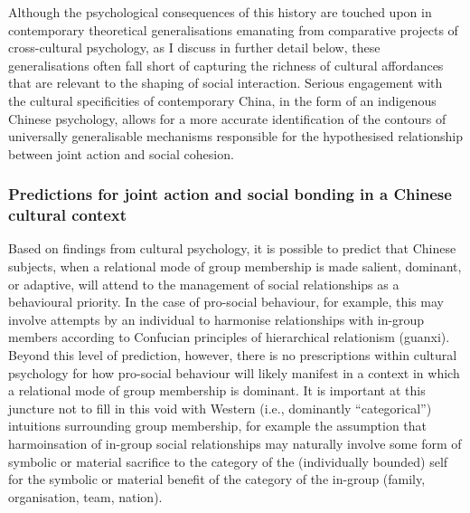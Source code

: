 {Although the psychological consequences of this history are touched upon in contemporary theoretical generalisations emanating from comparative projects of cross-cultural psychology, as I discuss in further detail below, these generalisations often fall short of capturing the richness of cultural affordances that are relevant to the shaping of social interaction.  Serious engagement with the cultural specificities of contemporary China, in the form of an indigenous Chinese psychology, allows for a more accurate identification of the contours of universally generalisable mechanisms responsible for the hypothesised relationship between joint action and social cohesion.




  \subsubsection{Predictions for joint action and social bonding in a Chinese cultural context}


  Based on findings from cultural psychology, it is possible to predict that Chinese subjects, when a relational mode of group membership is made salient, dominant, or adaptive, will attend to the management of social relationships as a behavioural priority.  In the case of pro-social behaviour, for example, this may involve attempts by an individual to harmonise relationships with in-group members according to Confucian principles of hierarchical relationism (guanxi).  Beyond this level of prediction, however, there is no prescriptions within cultural psychology for how pro-social behaviour will likely manifest in a context in which a relational mode of group membership is dominant.  It is important at this juncture not to fill in this void with Western (i.e., dominantly ``categorical'') intuitions surrounding group membership, for example the assumption that harmoinsation of in-group social relationships may naturally involve some form of symbolic or material sacrifice to the category of the (individually bounded) self for the symbolic or material benefit of the category of the in-group (family, organisation, team, nation).

}
